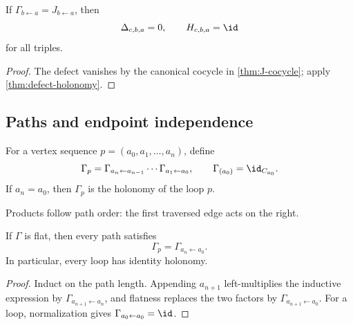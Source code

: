 \begin{corollary}
\label{cor:canonical-zero-defect}
If $\Gamma_{b\leftarrow a}=J_{b\leftarrow a}$, then
\[
\Delta_{c,b,a}=0,
\qquad
H_{c,b,a}=\id
\]
for all triples.
\end{corollary}

\begin{proof}
The defect vanishes by the canonical cocycle in
\cref{thm:J-cocycle}; apply \cref{thm:defect-holonomy}.
\end{proof}

\subsection{Paths and endpoint independence}

\begin{definition}
\label{def:path-transport}
For a vertex sequence
$p=(a_0,a_1,\ldots,a_n)$, define
\[
\Gamma_p
=
\Gamma_{a_n\leftarrow a_{n-1}}\cdots
\Gamma_{a_1\leftarrow a_0},
\qquad
\Gamma_{(a_0)}=\id_{C_{a_0}}.
\]
If $a_n=a_0$, then $\Gamma_p$ is the holonomy of the loop $p$.
\end{definition}

Products follow path order: the first traversed edge acts on the right.

\begin{proposition}
\label{prop:flat-endpoints}
If $\Gamma$ is flat, then every path satisfies
\[
\Gamma_p=\Gamma_{a_n\leftarrow a_0}.
\]
In particular, every loop has identity holonomy.
\end{proposition}

\begin{proof}
Induct on the path length.  Appending $a_{n+1}$ left-multiplies the
inductive expression by $\Gamma_{a_{n+1}\leftarrow a_n}$, and flatness
replaces the two factors by
$\Gamma_{a_{n+1}\leftarrow a_0}$.  For a loop, normalization gives
$\Gamma_{a_0\leftarrow a_0}=\id$.
\end{proof}

